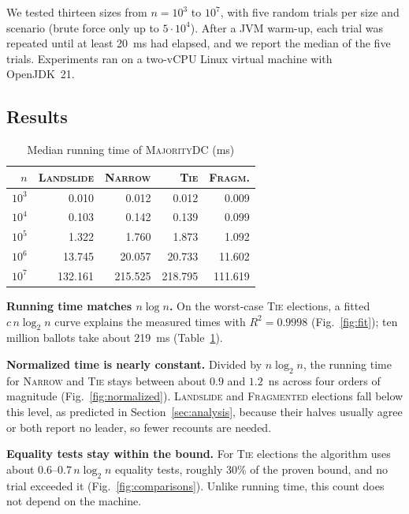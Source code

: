 \documentclass[conference]{IEEEtran}
\begin{document}
We tested thirteen sizes from $n = 10^3$ to $10^7$, with five random trials
per size and scenario (brute force only up to $5\cdot 10^4$). After a JVM
warm-up, each trial was repeated until at least 20~ms had elapsed, and we
report the median of the five trials. Experiments ran on a two-vCPU Linux
virtual machine with OpenJDK~21.

\subsection{Results}


\begin{table}[t]
\centering
\caption{Median running time of \textsc{MajorityDC} (ms)}
\label{tab:results}
\begin{tabular}{@{}rrrrr@{}}
\toprule
$n$ & \textsc{Landslide} & \textsc{Narrow} & \textsc{Tie} & \textsc{Fragm.} \\
\midrule
$10^3$ & 0.010 & 0.012 & 0.012 & 0.009 \\
$10^4$ & 0.103 & 0.142 & 0.139 & 0.099 \\
$10^5$ & 1.322 & 1.760 & 1.873 & 1.092 \\
$10^6$ & 13.745 & 20.057 & 20.733 & 11.602 \\
$10^7$ & 132.161 & 215.525 & 218.795 & 111.619 \\
\bottomrule
\end{tabular}
\end{table}

\textbf{Running time matches $n\log n$.} On the worst-case \textsc{Tie} elections,
a fitted $c\,n\log_2 n$ curve explains the measured times with $R^2 = 0.9998$
(Fig.~\ref{fig:fit}); ten million ballots take about 219~ms
(Table~\ref{tab:results}).

\textbf{Normalized time is nearly constant.} Divided by $n\log_2 n$, the running
time for \textsc{Narrow} and \textsc{Tie} stays between about $0.9$ and
$1.2$~ns across four orders of magnitude (Fig.~\ref{fig:normalized}).
\textsc{Landslide} and \textsc{Fragmented} elections fall below this level, as
predicted in Section~\ref{sec:analysis}, because their halves usually agree or
both report no leader, so fewer recounts are needed.

\textbf{Equality tests stay within the bound.} For \textsc{Tie} elections the
algorithm uses about $0.6$--$0.7\,n\log_2 n$ equality tests, roughly 30\% of
the proven bound, and no trial exceeded it (Fig.~\ref{fig:comparisons}).
Unlike running time, this count does not depend on the machine.
\end{document}
